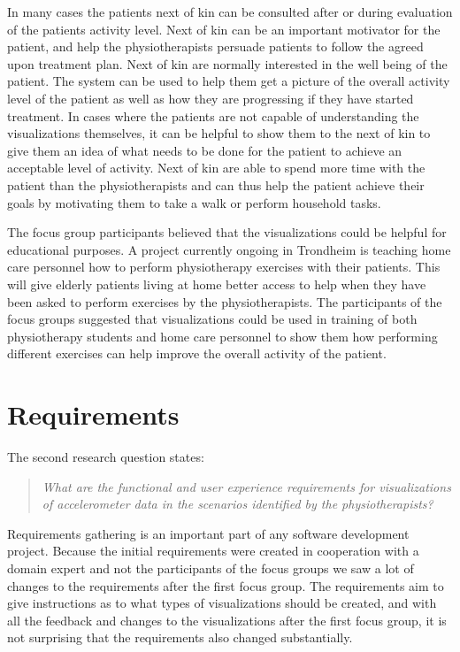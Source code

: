 In many cases the patients next of kin can be consulted after or during evaluation of the patients activity level. Next of kin can be an important motivator for the patient, and help the physiotherapists persuade patients to follow the agreed upon treatment plan. Next of kin are normally interested in the well being of the patient. The system can be used to help them get a picture of the overall activity level of the patient as well as how they are progressing if they have started treatment. In cases where the patients are not capable of understanding the visualizations themselves, it can be helpful to show them to the next of kin to give them an idea of what needs to be done for the patient to achieve an acceptable level of activity. Next of kin are able to spend more time with the patient than the physiotherapists and can thus help the patient achieve their goals by motivating them to take a walk or perform household tasks.

The focus group participants believed that the visualizations could be helpful for educational purposes. A project currently ongoing in Trondheim is teaching home care personnel how to perform physiotherapy exercises with their patients. This will give elderly patients living at home better access to help when they have been asked to perform exercises by the physiotherapists. The participants of the focus groups suggested that visualizations could be used in training of both physiotherapy students and home care personnel to show them how performing different exercises can help improve the overall activity of the patient.

\section{Requirements}
The second research question states:
\begin{quote}
\textit{What are the functional and user experience requirements for visualizations of accelerometer data in the scenarios identified by the physiotherapists?}
\end{quote}

Requirements gathering is an important part of any software development project. Because the initial requirements were created in cooperation with a domain expert and not the participants of the focus groups we saw a lot of changes to the requirements after the first focus group. The requirements aim to give instructions as to what types of visualizations should be created, and with all the feedback and changes to the visualizations after the first focus group, it is not surprising that the requirements also changed substantially.

